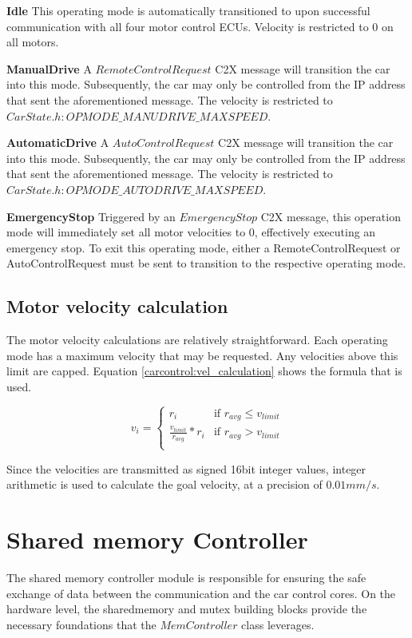 \textbf{Idle} This operating mode is automatically transitioned to upon successful communication with all four motor control ECUs. Velocity is restricted to 0 on all motors.

\textbf{ManualDrive} A $RemoteControlRequest$ C2X message will transition the car into this mode. Subsequently, the car may only be controlled from the IP address that sent the aforementioned message. The velocity is restricted to $CarState.h:OPMODE\_MANUDRIVE\_MAXSPEED$.

\textbf{AutomaticDrive} A $AutoControlRequest$ C2X message will transition the car into this mode. Subsequently, the car may only be controlled from the IP address that sent the aforementioned message. The velocity is restricted to $CarState.h:OPMODE\_AUTODRIVE\_MAXSPEED$.

\textbf{EmergencyStop} Triggered by an $EmergencyStop$ C2X message, this operation mode will immediately set all motor velocities to 0, effectively executing an emergency stop. To exit this operating mode, either a RemoteControlRequest or AutoControlRequest must be sent to transition to the respective operating mode.

\subsection{Motor velocity calculation}
The motor velocity calculations are relatively straightforward. Each operating mode has a maximum velocity that may be requested. Any velocities above this limit are capped. Equation \eqref{carcontrol:vel_calculation} shows the formula that is used.

\begin{equation}\label{carcontrol:vel_calculation}
v_{i} = 
\begin{cases} 
r_{i} & \text{if } r_{avg} \leq v_{limit} \\
\frac{v_{limit}}{r_{avg}} * r_{i} & \text{if } r_{avg} \gt v_{limit} \\
\end{cases}
\end{equation}

Since the velocities are transmitted as signed 16bit integer values, integer arithmetic is used to calculate the goal velocity, at a precision of $0.01mm/s$.

\section{Shared memory Controller}
The shared memory controller module is responsible for ensuring the safe exchange of data between the communication and the car control cores. On the hardware level, the sharedmemory and mutex building blocks provide the necessary foundations that the \textbf{$MemController$} class leverages.

